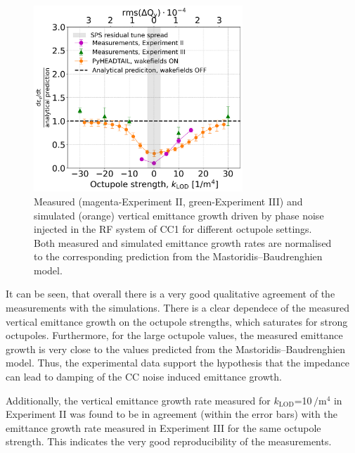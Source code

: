 \begin{figure}[!htb]
   \centering         
   \includegraphics[width=0.7\textwidth]{images/Ch8/deyRates_sps_270GeV_PN1e-8_400MHz_SPS_NewWakesAllcontributions_appendWakes_y-plane_WakesONvsOFF_QpxQpy1_6D_Nb5e5_intensity3e10Scan_simulations_vs_measurements_magenta_new_legend_IPAC22_May_and_September_2022_for_thesis.png}
       \caption{Measured (magenta-Experiment II, green-Experiment III) and simulated (orange) vertical emittance growth driven by phase noise injected in the RF system of CC1 for different octupole settings. Both measured and simulated emittance growth rates are normalised to the corresponding prediction from the Mastoridis--Baudrenghien model.}
       \label{fig:cc_md_2022_measurement_vs_pyheadtail_simualtion_sep22}
\end{figure}


It can be seen, that overall there is a very good qualitative agreement of the measurements with the simulations. There is a clear dependece of the measured vertical emittance growth on the octupole strengths, which saturates for strong octupoles. Furthermore, for the large octupole values, the measured emittance growth is very close to the values predicted from the Mastoridis--Baudrenghien model. Thus, the experimental data support the hypothesis that the impedance can lead to damping of the CC noise induced emittance growth. 

Additionally, the vertical emittance growth rate measured for $k_\mathrm{LOD}$=10\,$\mathrm{/m^4}$ in Experiment II was found to be in agreement (within the error bars) with the emittance growth rate measured in Experiment III for the same octupole strength. This indicates the very good reproducibility of the measurements.

